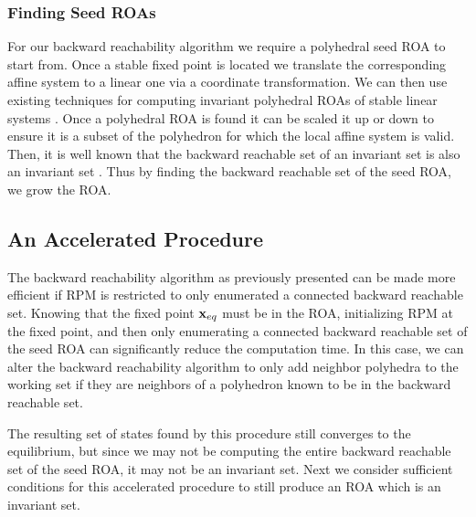 \subsubsection{Finding Seed ROAs} \label{seed}
For our backward reachability algorithm we require a polyhedral seed ROA to start from. Once a stable fixed point is located we translate the corresponding affine system to a linear one via a coordinate transformation. We can then use existing techniques for computing invariant polyhedral ROAs of stable linear systems \cite{hennet1995discrete}. 
Once a polyhedral ROA is found it can be scaled it up or down to ensure it is a subset of the polyhedron for which the local affine system is valid.
Then, it is well known that the backward reachable set of an invariant set is also an invariant set \cite{pwa_lygeros}.
Thus by finding the backward reachable set of the seed ROA, we grow the ROA.

\subsection{An Accelerated Procedure} \label{sec:homeo}
The backward reachability algorithm as previously presented can be made more efficient if RPM is restricted to only enumerated a connected backward reachable set.
Knowing that the fixed point $\mathbf{x}_{eq}$ must be in the ROA, initializing RPM at the fixed point, and then only enumerating a connected backward reachable set of the seed ROA can significantly reduce the computation time.
In this case, we can alter the backward reachability algorithm to only add neighbor polyhedra to the working set if they are neighbors of a polyhedron known to be in the backward reachable set. 

The resulting set of states found by this procedure still converges to the equilibrium, but since we may not be computing the entire backward reachable set of the seed ROA, it may not be an invariant set.
Next we consider sufficient conditions for this accelerated procedure to still produce an ROA which is an invariant set.

